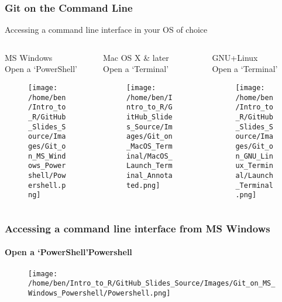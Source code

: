 \documentclass[xcolor=dvipsnames]{beamer}
\begin{document}
\begin{frame}
\frametitle{Git on the Command Line}
Accessing a command line interface in your OS of choice
\begin{columns}

\begin{column}{3.3cm}

\begin{center}
MS Windows\\
Open a `PowerShell'

\begin{figure}
\texttt{[image: /home/ben/Intro\_to\_R/GitHub\_Slides\_Source/Images/Git\_on\_MS\_Windows\_Powershell/Powershell.png]}
\end{figure}

\end{center}

\end{column} 

\begin{column}{3.3cm}
Mac OS X \& later\\
Open a `Terminal'
\begin{center}
\begin{figure}
\texttt{[image: /home/ben/Intro\_to\_R/GitHub\_Slides\_Source/Images/Git\_on\_MacOS\_Terminal/MacOS\_Launch\_Terminal\_Annotated.png]} %
\end{figure}
\end{center}
\end{column} 

\begin{column}{3.3cm}

\begin{center}
GNU+Linux\\
Open a `Terminal'

\begin{figure}
\texttt{[image: /home/ben/Intro\_to\_R/GitHub\_Slides\_Source/Images/Git\_on\_GNU\_Linux\_Terminal/Launch\_Terminal.png]}
\end{figure}

\end{center}

\end{column} 

\end{columns}
\end{frame}

\begin{frame}
\frametitle{Accessing a command line interface from MS Windows}
\framesubtitle{Open a `PowerShell'Powershell}
\begin{center}
\begin{figure}
\texttt{[image: /home/ben/Intro\_to\_R/GitHub\_Slides\_Source/Images/Git\_on\_MS\_Windows\_Powershell/Powershell.png]}
\end{figure}
\end{center}
\end{frame}
\end{document}
